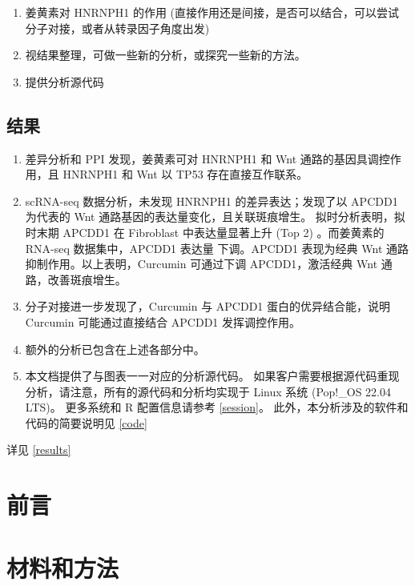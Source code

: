 \documentclass[
]{article}
\providecommand{\tightlist}{%
  \setlength{\itemsep}{0pt}\setlength{\parskip}{0pt}}
\begin{document}
\begin{enumerate}
\def\labelenumi{\arabic{enumi}.}
\setcounter{enumi}{2}
\tightlist
\item
  姜黄素对 HNRNPH1 的作用 (直接作用还是间接，是否可以结合，可以尝试分子对接，或者从转录因子角度出发)
\item
  视结果整理，可做一些新的分析，或探究一些新的方法。
\item
  提供分析源代码
\end{enumerate}

\hypertarget{ux7ed3ux679c}{%
\subsection{结果}\label{ux7ed3ux679c}}

\begin{enumerate}
\def\labelenumi{\arabic{enumi}.}
\tightlist
\item
  差异分析和 PPI 发现，姜黄素可对 HNRNPH1 和 Wnt 通路的基因具调控作用，且 HNRNPH1 和 Wnt 以 TP53 存在直接互作联系。
\item
  scRNA-seq 数据分析，未发现 HNRNPH1 的差异表达；发现了以 APCDD1 为代表的 Wnt 通路基因的表达量变化，且关联斑痕增生。
  拟时分析表明，拟时末期 APCDD1 在 Fibroblast 中表达量显著上升 (Top 2) 。而姜黄素的 RNA-seq 数据集中，APCDD1 表达量
  下调。APCDD1 表现为经典 Wnt 通路抑制作用。以上表明，Curcumin 可通过下调 APCDD1，激活经典 Wnt 通路，改善斑痕增生。
\item
  分子对接进一步发现了，Curcumin 与 APCDD1 蛋白的优异结合能，说明 Curcumin 可能通过直接结合 APCDD1 发挥调控作用。
\item
  额外的分析已包含在上述各部分中。
\item
  本文档提供了与图表一一对应的分析源代码。
  如果客户需要根据源代码重现分析，请注意，所有的源代码和分析均实现于 Linux 系统 (Pop!\_OS 22.04 LTS)。
  更多系统和 R 配置信息请参考 \ref{session}。
  此外，本分析涉及的软件和代码的简要说明见 \ref{code}
\end{enumerate}

详见 \ref{results}

\hypertarget{introduction}{%
\section{前言}\label{introduction}}

\hypertarget{methods}{%
\section{材料和方法}\label{methods}}
\end{document}
